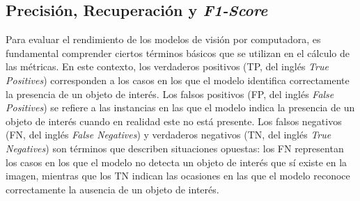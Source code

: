 \subsection{Precisión, Recuperación y \textit{F1-Score}}

Para evaluar el rendimiento de los modelos de visión por computadora, es fundamental comprender ciertos términos básicos que se utilizan en el cálculo de las métricas. En este contexto, los verdaderos positivos (TP, del inglés \textit{True Positives}) corresponden a los casos en los que el modelo identifica correctamente la presencia de un objeto de interés. Los falsos positivos (FP, del inglés \textit{False Positives}) se refiere a las instancias en las que el modelo indica la presencia de un objeto de interés cuando en realidad este no está presente. Los falsos negativos (FN, del inglés \textit{False Negatives}) y verdaderos negativos (TN, del inglés \textit{True Negatives}) son términos que describen situaciones opuestas: los FN representan los casos en los que el modelo no detecta un objeto de interés que sí existe en la imagen, mientras que los TN indican las ocasiones en las que el modelo reconoce correctamente la ausencia de un objeto de interés.

